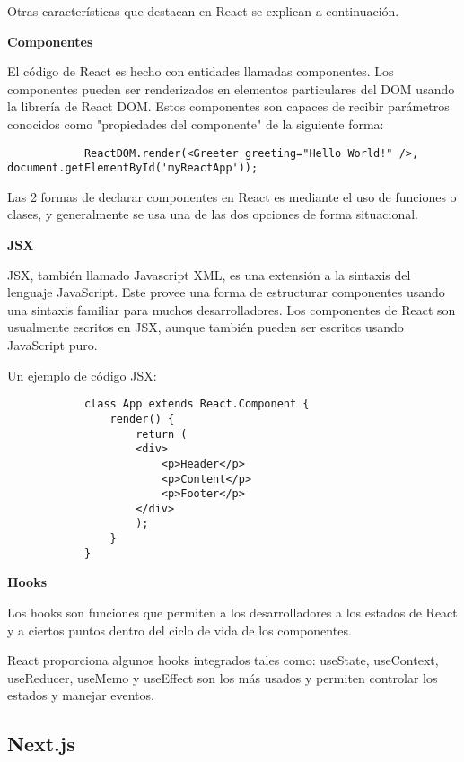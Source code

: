 Otras características que destacan en React se explican a continuación.

    \noindent \textbf{Componentes} \hfill

        El código de React es hecho con entidades llamadas componentes. Los componentes pueden ser renderizados en elementos particulares del DOM usando la librería de React DOM. Estos componentes son capaces de recibir parámetros conocidos como "propiedades del componente" de la siguiente forma: \hfill 

        \begin{lstlisting}
            ReactDOM.render(<Greeter greeting="Hello World!" />, document.getElementById('myReactApp'));
        \end{lstlisting}

        Las 2 formas de declarar componentes en React es mediante el uso de funciones o clases, y generalmente se usa una de las dos opciones de forma situacional.

   \noindent \textbf{JSX} \hfill

        JSX, también llamado Javascript XML, es una extensión a la sintaxis del lenguaje JavaScript. Este provee una forma de estructurar componentes usando una sintaxis familiar para muchos desarrolladores. Los componentes de React son usualmente escritos en JSX, aunque también pueden ser escritos usando JavaScript puro.

        Un ejemplo de código JSX:

        \begin{lstlisting}
            class App extends React.Component {
                render() {
                    return (
                    <div>
                        <p>Header</p>
                        <p>Content</p>
                        <p>Footer</p>
                    </div>
                    );
                }
            }
        \end{lstlisting}

   \noindent \textbf{Hooks} \hfill 

        Los hooks son funciones que permiten a los desarrolladores  a los estados de React y a ciertos puntos dentro del ciclo de vida de los componentes.

        React proporciona algunos hooks integrados tales como: useState, useContext, useReducer, useMemo y useEffect son los más usados y permiten controlar los estados y manejar eventos.


\subsection{Next.js}


